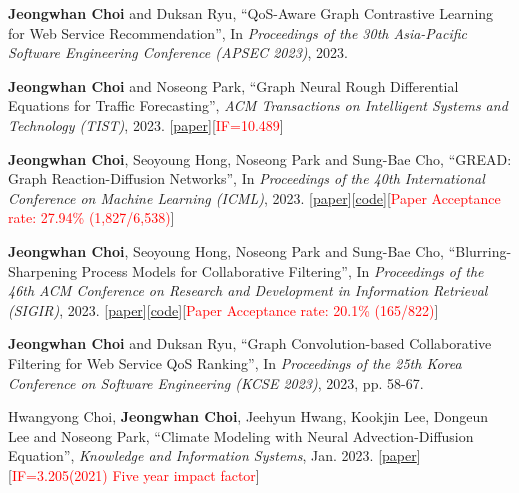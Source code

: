 \documentclass[10pt]{article}
\newenvironment{changemargin}[2]{
  \begin{list}{}{
    \setlength{\topsep}{0pt}
    \setlength{\leftmargin}{#1}
    \setlength{\rightmargin}{#2}
    \setlength{\listparindent}{\parindent}
    \setlength{\itemindent}{\parindent}
    \setlength{\parsep}{\parskip}
  }
  \item[]}{\end{list}
}
\newcommand{\presentation}[2]{
	{#1} \hfill \emph{#2}\\ \bigskip
}
\newcommand{\RED}[1]{\textcolor{red}{#1}}
\newenvironment{body} {
	\vspace*{-16pt}
	\begin{changemargin}{-0.25in}{-0.5in}
  }
	{\end{changemargin}
}
\begin{document}
\begin{body}
\presentation{
\textbf{Jeongwhan Choi} and Duksan Ryu, ``QoS-Aware Graph Contrastive Learning for Web Service Recommendation'', In \emph{Proceedings of the 30th Asia-Pacific Software Engineering Conference (APSEC 2023)}, 2023.}{}
\presentation{
\textbf{Jeongwhan Choi} and Noseong Park, ``Graph Neural Rough Differential Equations for Traffic Forecasting'', \emph{ACM Transactions on Intelligent Systems and Technology (TIST)}, 2023. [\href{https://dl.acm.org/doi/abs/10.1145/3604808}{paper}][\RED{IF=10.489}]}{}
\presentation{
\textbf{Jeongwhan Choi}, Seoyoung Hong, Noseong Park and Sung-Bae Cho, ``GREAD: Graph Reaction-Diffusion Networks'', In \emph{Proceedings of the 40th International Conference on Machine Learning (ICML)}, 2023. [\href{http://proceedings.mlr.press/v202/choi23a}{paper}][\href{https://github.com/jeongwhanchoi/GREAD}{code}][\RED{Paper Acceptance rate: 27.94\% (1,827/6,538)}]}{}
\presentation{
\textbf{Jeongwhan Choi}, Seoyoung Hong, Noseong Park and Sung-Bae Cho, ``Blurring-Sharpening Process Models for Collaborative Filtering'', In \emph{Proceedings of the 46th ACM Conference on Research and Development in Information Retrieval (SIGIR)}, 2023. [\href{https://arxiv.org/abs/2211.09324}{paper}][\href{https://github.com/jeongwhanchoi/bspm}{code}][\RED{Paper Acceptance rate: 20.1\% (165/822)}]}{}
\presentation{
\textbf{Jeongwhan Choi} and Duksan Ryu, ``Graph Convolution-based Collaborative Filtering for Web Service QoS Ranking'', In \emph{Proceedings of the 25th Korea Conference on Software Engineering (KCSE 2023)}, 2023, pp. 58-67.}{}
\presentation{
Hwangyong Choi, \textbf{Jeongwhan Choi}, Jeehyun Hwang, Kookjin Lee, Dongeun Lee and Noseong Park, ``Climate Modeling with Neural Advection-Diffusion Equation'', \emph{Knowledge and Information Systems}, Jan. 2023. [\href{https://doi.org/10.1007/s10115-023-01829-2}{paper}] [\RED{IF=3.205(2021) Five year impact factor}]}{}


\end{body}
\end{document}
